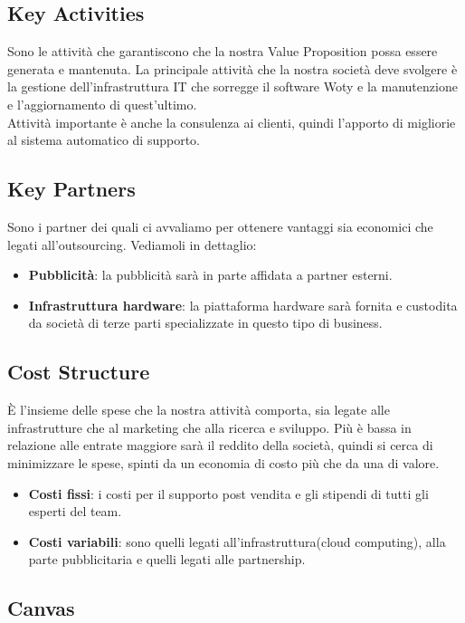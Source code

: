 \subsection{Key Activities}
Sono le attività che garantiscono che la nostra Value Proposition possa essere generata e mantenuta. La principale attività che la nostra società deve svolgere è la gestione dell'infrastruttura IT che sorregge il software Woty e la manutenzione e l'aggiornamento di quest'ultimo.\\
Attività importante è anche la consulenza ai clienti, quindi l'apporto di migliorie al sistema automatico di supporto.\\

\subsection{Key Partners}
Sono i partner dei quali ci avvaliamo per ottenere vantaggi sia economici che legati all'out\-sourcing. Vediamoli in dettaglio:
\begin{itemize}
\item \textbf{Pubblicità}: la pubblicità sarà in parte affidata a partner esterni.
\item \textbf{Infrastruttura hardware}: la piattaforma hardware sarà fornita e custodita da società di terze parti specializzate in questo tipo di business.
\end{itemize}

\subsection{Cost Structure}
È l'insieme delle spese che la nostra attività comporta, sia legate alle infrastrutture che al marketing che alla ricerca e sviluppo. Più è bassa in relazione alle entrate maggiore sarà il reddito della società, quindi si cerca di minimizzare le spese, spinti da un economia di costo più che da una di valore.
\begin{itemize}
\item \textbf{Costi fissi}: i costi per il supporto post vendita e gli stipendi di tutti gli esperti del team.
\item \textbf{Costi variabili}: sono quelli legati all'infrastruttura(cloud computing), alla parte  pubblicitaria e quelli legati alle partnership.
\end{itemize}

\newpage

\subsection{Canvas}

